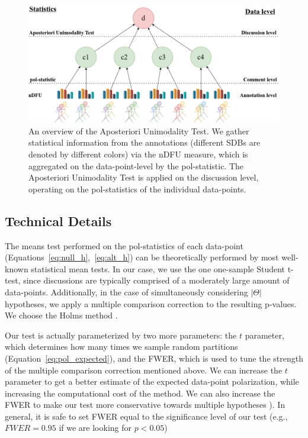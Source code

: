 \documentclass{article}
\begin{document}
\begin{figure}
	\includegraphics[width=\linewidth]{overview.png}
	\caption{An overview of the Aposteriori Unimodality Test. We gather statistical information from the annotations (different \acp{SDB} are denoted by different colors) via the \ac{nDFU} measure, which is aggregated on the data-point-level by the pol-statistic. The Aposteriori Unimodality Test is applied on the discussion level, operating on the pol-statistics of the individual data-points.}
	\label{fig::overview}
\end{figure}


\subsection{Technical Details}
\label{ssec:methodology:details}

The means test performed on the pol-statistics of each data-point (Equations~\ref{eq:null_h},~\ref{eq:alt_h}) can be theoretically performed by most well-known statistical mean tests. In our case, we use the one one-sample Student t-test, since discussions are typically comprised of a moderately large amount of data-points. Additionally, in the case of simultaneously considering $\lvert \Theta \rvert$ hypotheses, we apply a multiple comparison correction to the resulting p-values. We choose the Holms method \parencite{holms}.

Our test is actually parameterized by two more parameters: the $t$ parameter, which determines how many times we sample random partitions (Equation~\ref{eq:pol_expected}), and the \ac{FWER}, which is used to tune the strength of the multiple comparison correction mentioned above. We can increase the $t$ parameter to get a better estimate of the expected data-point polarization, while increasing the computational cost of the method. We can also increase the \ac{FWER} to make our test more conservative towards multiple hypotheses \parencite{ChenFengYi2017}). In general, it is safe to set \ac{FWER} equal to the significance level of our test (e.g., $\textit{FWER} = 0.95$ if we are looking for $p < 0.05$)
\end{document}
